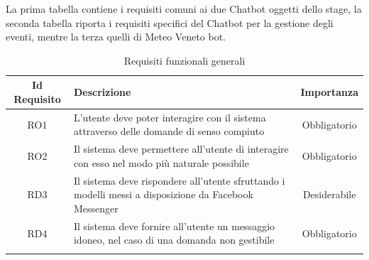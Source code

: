 La prima tabella contiene i requisiti comuni ai due \gls{Chatbot} oggetti dello stage, la seconda tabella riporta i requisiti specifici del \gls{Chatbot} per la gestione degli eventi, mentre la terza quelli di Meteo Veneto bot.
\newpage
\normalsize
\begin{longtable}{|c|>{\centering}m{7cm}|c|}
\hline
\textbf{Id Requisito} & \textbf{Descrizione} & \textbf{Importanza}\\
\hline
\endhead
RO1 & L'utente deve poter interagire con il sistema attraverso delle domande di senso compiuto & Obbligatorio\\ 
RO2 & Il sistema deve permettere all'utente di interagire con esso nel modo più naturale possibile & Obbligatorio \\
RD3 & Il sistema deve rispondere all'utente sfruttando i modelli messi a disposizione da Facebook Messenger & Desiderabile\\
RD4 & Il sistema deve fornire all'utente un messaggio idoneo, nel caso di una domanda non gestibile & Obbligatorio\\
\hline
\caption{Requisiti funzionali generali}
\end{longtable}

